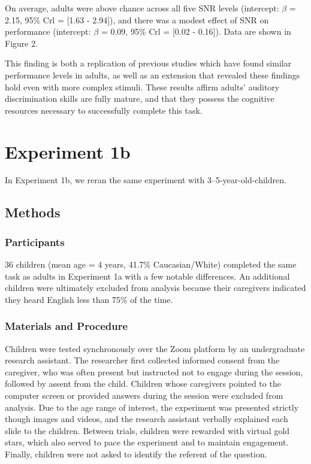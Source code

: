 \documentclass[10pt, letterpaper]{article}
\begin{document}
On average, adults were above chance across all five SNR levels
(intercept: \(\beta\) = 2.15, 95\% Crl = {[}1.63 - 2.94{]}), and there
was a modest effect of SNR on performance (intercept: \(\beta\) = 0.09,
95\% Crl = {[}0.02 - 0.16{]}). Data are shown in Figure 2.

This finding is both a replication of previous studies which have found
similar performance levels in adults, as well as an extension that
revealed these findings hold even with more complex stimuli. These
results affirm adults' auditory discrimination skills are fully mature,
and that they possess the cognitive resources necessary to successfully
complete this task.

\hypertarget{experiment-1b}{%
\section{Experiment 1b}\label{experiment-1b}}

In Experiment 1b, we reran the same experiment with
3--5-year-old-children.

\hypertarget{methods-1}{%
\subsection{Methods}\label{methods-1}}

\hypertarget{participants-1}{%
\subsubsection{Participants}\label{participants-1}}

36 children (mean age = 4 years, 41.7\% Caucasian/White) completed the
same task as adults in Experiment 1a with a few notable differences. An
additional children were ultimately excluded from analysis because their
caregivers indicated they heard English less than 75\% of the time.

\hypertarget{materials-and-procedure-1}{%
\subsubsection{Materials and
Procedure}\label{materials-and-procedure-1}}

Children were tested synchronously over the Zoom platform by an
undergraduate research assistant. The researcher first collected
informed consent from the caregiver, who was often present but
instructed not to engage during the session, followed by assent from the
child. Children whose caregivers pointed to the computer screen or
provided answers during the session were excluded from analysis. Due to
the age range of interest, the experiment was presented strictly though
images and videos, and the research assistant verbally explained each
slide to the children. Between trials, children were rewarded with
virtual gold stars, which also served to pace the experiment and to
maintain engagement. Finally, children were not asked to identify the
referent of the question.
\end{document}

